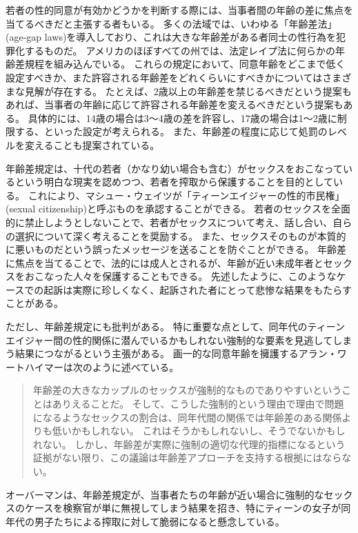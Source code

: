 \documentclass[paper=a4,book,openany]{jlreq}
\begin{document}
若者の性的同意が有効かどうかを判断する際には、当事者間の年齢の差に焦点を当てるべきだと主張する者もいる。
多くの法域では、いわゆる「年齢差法」(age-gap laws)を導入しており、これは大きな年齢差がある者同士の性行為を犯罪化するものだ。
アメリカのほぼすべての州では、法定レイプ法に何らかの年齢差規程を組み込んでいる。
これらの規定において、同意年齢をどこまで低く設定すべきか、また許容される年齢差をどれくらいにすべきかについてはさまざまな見解が存在する。
たとえば、2歳以上の年齢差を禁じるべきだという提案もあれば\citep{waites04:_age_consen_sexual_consen}、当事者の年齢に応じて許容される年齢差を変えるべきだという提案もある。
具体的には、14歳の場合は3～4歳の差を許容し、17歳の場合は1～2歳に制限する、といった設定が考えられる。
また、年齢差の程度に応じて処罰のレベルを変えることも提案されている。

年齢差規定は、十代の若者（かなり幼い場合も含む）がセックスをおこなっているという明白な現実を認めつつ、若者を搾取から保護することを目的としている。
これにより、マシュー・ウェイツが「ティーンエイジャーの性的市民権」(sexual citizenship)と呼ぶものを承認することができる。
若者のセックスを全面的に禁止しようとしないことで、若者がセックスについて考え、話し合い、自らの選択について深く考えることを奨励する。
また、セックスそのものが本質的に悪いものだという誤ったメッセージを送ることを防ぐことができる。
年齢差に焦点を当てることで、法的には成人とされるが、年齢が近い未成年者とセックスをおこなった人々を保護することもできる。
先述したように、このようなケースでの起訴は実際に珍しくなく、起訴された者にとって悲惨な結果をもたらすことがある。

ただし、年齢差規定にも批判がある。
特に重要な点として、同年代のティーンエイジャー間の性的関係に潜んでいるかもしれない強制的な要素を見逃してしまう結果につながるという主張がある。
画一的な同意年齢を擁護するアラン・ワートハイマーは次のように述べている。

\begin{quote}
年齢差の大きなカップルのセックスが強制的なものでありやすいということはありえることだ。
そして、こうした強制的という理由で理由で問題になるようなセックスの割合は、同年代間の関係では年齢差のある関係よりも低いかもしれない。
これはそうかもしれないし、そうでないかもしれない。
しかし、年齢差が実際に強制の適切な代理的指標になるという証拠がない限り、この議論は年齢差アプローチを支持する根拠にはならない。
\citep[p.218]{wertheimer03:_consen_sexual_relat}
\end{quote}

オーバーマンは、年齢差規定が、当事者たちの年齢が近い場合に強制的なセックスのケースを検察官が単に無視してしまう結果を招き、特にティーンの女子が同年代の男子たちによる搾取に対して脆弱になると懸念している\citep[p.751]{oberman01:_girls_master_house}。
\end{document}
